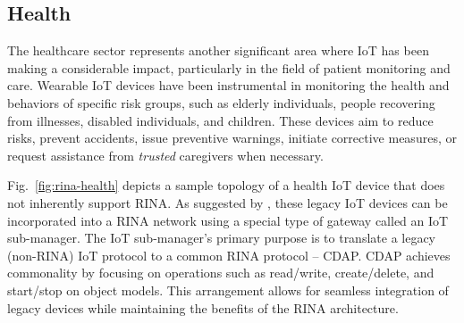 \documentclass{ieeeaccess}
\begin{document}
\subsection{Health}
%
The healthcare sector represents another significant area where IoT has been making a considerable impact, particularly in the field of patient monitoring and care. Wearable IoT devices have been instrumental in monitoring the health and behaviors of specific risk groups, such as elderly individuals, people recovering from illnesses, disabled individuals, and children. These devices aim to reduce risks, prevent accidents, issue preventive warnings, initiate corrective measures, or request assistance from \textit{trusted} caregivers when necessary.

Fig.~\ref{fig:rina-health} depicts a sample topology of a health IoT device that does not inherently support RINA. As suggested by \cite{maryan2020}, these legacy IoT devices can be incorporated into a RINA network using a special type of gateway called an IoT sub-manager. The IoT sub-manager's primary purpose is to translate a legacy (non-RINA) IoT protocol to a common RINA protocol – CDAP. CDAP achieves commonality by focusing on operations such as read/write, create/delete, and start/stop on object models. This arrangement allows for seamless integration of legacy devices while maintaining the benefits of the RINA architecture.
\end{document}
